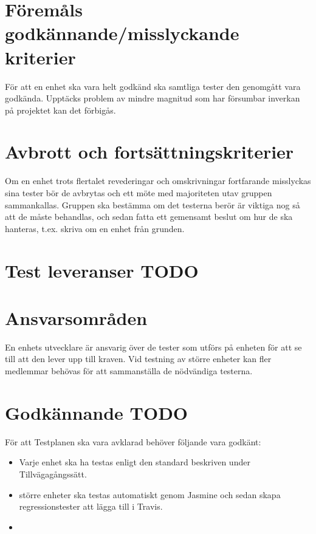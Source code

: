 \documentclass[10pt]{article}
\begin{document}
	

\section{Föremåls godkännande/misslyckande kriterier}
	För att en enhet ska vara helt godkänd ska samtliga tester den genomgått vara godkända. Upptäcks problem av mindre magnitud som har försumbar inverkan på projektet kan det förbigås.



\section{Avbrott och fortsättningskriterier}
	Om en enhet trots flertalet revederingar och omskrivningar fortfarande misslyckas sina tester bör de avbrytas och ett möte med majoriteten utav gruppen sammankallas. 
	Gruppen ska bestämma om det testerna berör är viktiga nog så att de måste behandlas, och sedan fatta ett gemensamt beslut om hur de ska hanteras, t.ex. skriva om en enhet från grunden.


\section{Test leveranser {\color{red}TODO}}





\section{Ansvarsområden}
	En enhets utvecklare är ansvarig över de tester som utförs på enheten för att se till att den lever upp till kraven. Vid testning av större enheter kan fler medlemmar behövas för att sammanställa de nödvändiga testerna.
	
	
	
\section{Godkännande {\color{red}TODO}}
	För att Testplanen ska vara avklarad behöver följande vara godkänt:
	\begin{itemize}
	 \item Varje enhet ska ha testas enligt den standard beskriven under Tillvägagångssätt.
	 \item större enheter ska testas automatiskt genom {\color{red}Jasmine} och sedan skapa regressionstester att lägga till i Travis.
	 \item 
	\end{itemize}
	
\end{document}
